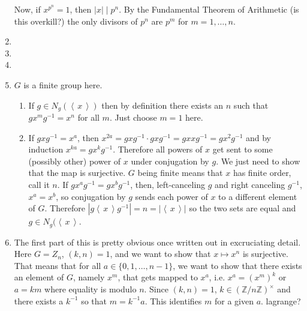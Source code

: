 \documentclass[]{article}
\newcommand{\abs}[1]{\left\vert #1 \right\vert}
\newcommand{\gen}[1]{\left\langle\, #1 \,\right\rangle}
\newcommand{\bbz}{\mathbb{Z}}
\begin{document}
\begin{enumerate}
Now, if $x^{p^n} = 1$, then $\abs{x}\mid p^n$. By the Fundamental Theorem of Arithmetic (is this overkill?) the only divisors of $p^n$ are $p^m$ for $m = 1,\ldots,n$.

\item 


\item 


\item 


\item $G$ is a finite group here.
\begin{enumerate}
\item If $g \in N_g(\gen{x})$ then by definition there exists an $n$ such that $gx^mg^{-1} = x^n$ for all $m$. Just choose $m=1$ here.
\item If $gxg^{-1} = x^a$, then $x^{2a} = gxg^{-1} \cdot gxg^{-1} = gxxg^{-1} = gx^2g^{-1}$ and by induction $x^{ka} = gx^kg^{-1}$. Therefore all powers of $x$ get sent to some (possibly other) power of $x$ under conjugation by $g$. We just need to show that the map is surjective. $G$ being finite means that $x$ has finite order, call it $n$. If $gx^ag^{-1} = gx^bg^{-1}$, then, left-canceling $g$ and right canceling $g^{-1}$, $x^a=x^b$, so conjugation by $g$ sends each power of $x$ to a different element of $G$. Therefore $\abs{g\gen{x}g^{-1}} = n = \abs{\gen{x}}$ so the two sets are equal and $g \in N_g(\gen{x}$.
\end{enumerate}


\item The first part of this is pretty obvious once written out in excruciating detail. Here $G = Z_n$, $(k,n) = 1$, and we want to show that $x\mapsto x^n$ is surjective. That means that for all $a \in \{0, 1, \ldots, n-1\}$, we want to show that there exists an element of $G$, namely $x^m$, that gets mapped to $x^a$, i.e. $x^a = (x^m)^k$ or $a = km$ where equality is modulo $n$. Since $(k,n) = 1$, $k \in (\bbz/n\bbz)^\times$ and there exists a $k^{-1}$ so that $m = k^{-1}a$. This identifies $m$ for a given $a$. {\color{red} lagrange?}



\end{enumerate}
\end{document}
